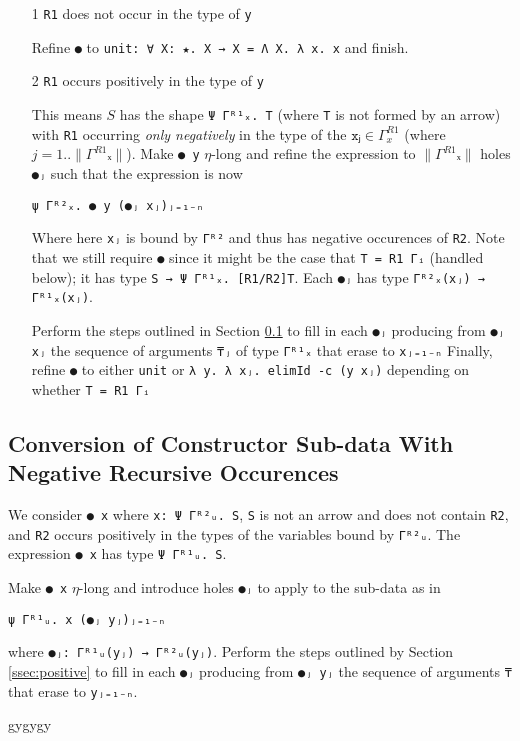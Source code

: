 \documentclass{article}
\newcommand{\lenc}[1]{\|#1\|}
\begin{document}
\begin{itemize}
\item[1] \verb;R1; does not occur in the type of \verb;y;

  Refine \verb;●; to \verb;unit: ∀ X: ★. X → X = Λ X. λ x. x; and finish.
\item[2] \verb;R1; occurs positively in the type of \verb;y;

  This means $S$ has the shape \verb;Ψ Γᴿ¹ₓ. T; (where \verb;T; is not formed by
  an arrow) with \verb;R1;
  occurring \textit{only negatively} in the type of the
  $\texttt{xⱼ} \in Γ^{R1}_x$ (where $j=1..\lenc{Γ^{R1}ₓ}$). Make \verb;● y;
  $\eta$-long and refine the expression to $\lenc{Γ^{R1}ₓ}$ holes \verb;●ⱼ; such
  that the expression is now
  
\begin{verbatim}
ψ Γᴿ²ₓ. ● y (●ⱼ xⱼ)ⱼ₌₁₋ₙ
\end{verbatim}

  \noindent Where here \verb;xⱼ; is bound by \verb;Γᴿ²; and thus has negative occurences
  of \verb;R2;. Note that we still require \verb;●; since it might be the case that
  \verb;T = R1 Γᵢ; (handled below); it has type \verb;S → Ψ Γᴿ¹ₓ. [R1/R2]T;.
  Each \verb;●ⱼ; has type \verb;Γᴿ²ₓ(xⱼ) → Γᴿ¹ₓ(xⱼ);.

  Perform the steps outlined in Section \ref{ssec:negative} to fill in each
  \verb;●ⱼ; producing from \verb;●ⱼ xⱼ; the sequence of arguments \verb;₸ⱼ; of
  type \verb;Γᴿ¹ₓ; that erase to \verb;xⱼ₌₁₋ₙ; Finally, refine \verb;●; to either \verb;unit; or
  \verb;λ y. λ xⱼ. elimId -c (y xⱼ); depending on whether \verb;T = R1 Γᵢ;

\end{itemize}

\subsection{Conversion of Constructor Sub-data With Negative Recursive
  Occurences}
\label{ssec:negative}
We consider \verb;● x; where \verb;x: Ψ Γᴿ²ᵤ. S;, \verb;S; is not an arrow
and does not contain \verb;R2;, and \verb;R2; occurs positively in the types of
the variables bound by \verb;Γᴿ²ᵤ;. The expression \verb;● x; has type
\verb;Ψ Γᴿ¹ᵤ. S;.

Make \verb;● x; $\eta$-long and introduce holes \verb;●ⱼ; to apply to the
sub-data as in

\begin{verbatim}
ψ Γᴿ¹ᵤ. x (●ⱼ yⱼ)ⱼ₌₁₋ₙ
\end{verbatim}

\noindent where \verb;●ⱼ: Γᴿ¹ᵤ(yⱼ) → Γᴿ²ᵤ(yⱼ);. Perform the steps outlined by
Section \ref{ssec:positive} to fill in each \verb;●ⱼ; producing from
\verb;●ⱼ yⱼ; the sequence of arguments \verb;₸; that erase to \verb;yⱼ₌₁₋ₙ;.


gygygy

\end{document}
